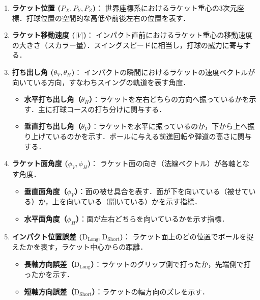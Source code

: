 \documentclass[../main]{subfiles}
\begin{document}
\begin{enumerate}
  \item \textbf{ラケット位置 ($P_X, P_Y, P_Z$)}：
  世界座標系におけるラケット重心の3次元座標．打球位置の空間的な高低や前後左右の位置を表す．

  \item \textbf{ラケット移動速度 ($|V|$)}：
  インパクト直前におけるラケット重心の移動速度の大きさ（スカラー量）．スイングスピードに相当し，打球の威力に寄与する．

  \item \textbf{打ち出し角 ($\theta_{V}, \theta_{H}$)}：
  インパクトの瞬間におけるラケットの速度ベクトルが向いている方向，すなわちスイングの軌道を表す角度．
  \begin{itemize}
      \item \textbf{水平打ち出し角（$\theta_{H}$）}：ラケットを左右どちらの方向へ振っているかを示す．主に打球コースの打ち分けに関与する．
      \item \textbf{垂直打ち出し角（$\theta_{V}$）}：ラケットを水平に振っているのか，下から上へ振り上げているのかを示す．ボールに与える前進回転や弾道の高さに関与する．
  \end{itemize}

  \item \textbf{ラケット面角度 ($\phi_{V}, \phi_{H}$)}：
  ラケット面の向き（法線ベクトル）が各軸となす角度．
  \begin{itemize}
      \item \textbf{垂直面角度（$\phi_{V}$）}：面の被せ具合を表す．面が下を向いている（被せている）か，上を向いている（開いている）かを示す指標．
      \item \textbf{水平面角度（$\phi_{H}$）}：面が左右どちらを向いているかを示す指標．
  \end{itemize}

  \item \textbf{インパクト位置誤差 ($\mathrm{D}_{\mathrm{Long}}, \mathrm{D}_{\mathrm{Short}}$)}：
  ラケット面上のどの位置でボールを捉えたかを表す，ラケット中心からの距離．
  \begin{itemize}
      \item \textbf{長軸方向誤差（$\mathrm{D}_{\mathrm{Long}}$）}：ラケットのグリップ側で打ったか，先端側で打ったかを示す．
      \item \textbf{短軸方向誤差（$\mathrm{D}_{\mathrm{Short}}$）}：ラケットの幅方向のズレを示す．
  \end{itemize}
\end{enumerate}
\end{document}
